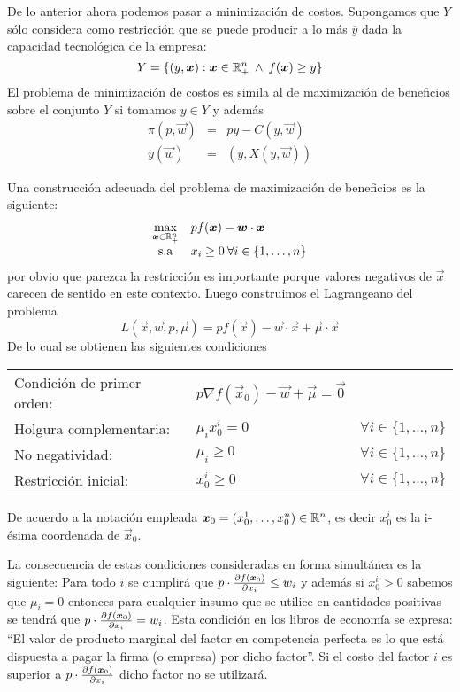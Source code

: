 De lo anterior ahora podemos pasar a minimizaci\'on de costos. Supongamos que $Y$ s\'olo considera como restricci\'on que se puede producir a lo m\'as $\overline{y}$ dada la capacidad tecnol\'ogica de la empresa:
$$Y=\{(y,\boldsymbol{x}) : \boldsymbol{x}\in\mathbb{R}^n_+ \:\wedge\: f(\boldsymbol{x})\geq y\}$$ 
El problema de minimizaci\'on de costos es simila al de maximizaci\'on de beneficios sobre el conjunto $Y$ si tomamos $y\in Y$ y adem\'as
\begin{eqnarray*}
\pi(p,\vec{w}) &=& py - C(y,\vec{w}) \\
y(\vec{w})&=&(y,X(y,\vec{w}))
\end{eqnarray*}

Una construcci\'on adecuada del problema de maximizaci\'on de beneficios es la siguiente:
\begin{equation*}
	\begin{array}{cl}
	\displaystyle \max_{\boldsymbol{x}\in \mathbb{R}^n_+} & pf(\boldsymbol{x}) - \boldsymbol{w}\cdot \boldsymbol{x} \\
	\text{s.a}				 & x_i \geq 0 \:\forall i\in\{1,\ldots,n\} 
	\end{array}
\end{equation*}
por obvio que parezca la restricci\'on es importante porque valores negativos de $\vec{x}$ carecen de sentido en este contexto. Luego construimos el Lagrangeano del problema
$$L(\vec{x},\vec{w},p,\vec{\mu})=pf(\vec{x})-\vec{w}\cdot \vec{x} + \vec{\mu} \cdot \vec{x}$$
De lo cual se obtienen las siguientes condiciones

\begin{center}
\begin{tabular}{llr}
Condici\'on de primer orden: & $p\nabla f(\vec{x}_0) - \vec{w} + \vec{\mu} = \vec{0}$ & \\
Holgura complementaria: & $\mu_i x_{0}^{i} = 0$ & $\forall i\in\{1,\ldots , n\}$ \\
No negatividad: & $\mu_i \geq 0$ & $\forall i\in\{1,\ldots , n\}$ \\
Restricci\'on inicial: & $x_0^i \geq 0$ & $\forall i\in\{1,\ldots , n\}$
\end{tabular}
\end{center}

\begin{nota}
De acuerdo a la notaci\'on empleada $\boldsymbol{x}_0=(x_0^1,\ldots,x_0^n)\in \mathbb{R}^n$, es decir $x_0^i$ es la i-\'esima coordenada de $\vec{x}_0$. 
\end{nota}

La consecuencia de estas condiciones consideradas en forma simult\'anea es la siguiente: Para todo $i$ se cumplir\'a que
$p\cdot \frac{\partial f(\boldsymbol{x}_{0})}{\partial x_i}\leq w_i$ y adem\'as si $x_{0}^i>0$ sabemos que $\mu_i=0$ entonces para cualquier insumo que se utilice en cantidades positivas se tendr\'a que $p\cdot \frac{\partial f(\boldsymbol{x}_{0})}{\partial x_i}= w_i$. Esta condici\'on en los libros de econom\'ia se expresa: ``El valor de producto marginal del factor en competencia perfecta es lo que est\'a dispuesta a pagar la firma (o empresa) por dicho factor''. Si el costo del factor $i$ es superior a $p\cdot \frac{\partial f(\boldsymbol{x}_{0})}{\partial x_i}$ dicho factor no se utilizar\'a.

